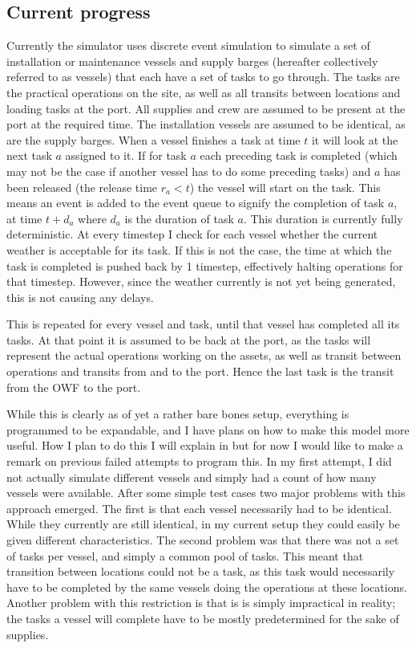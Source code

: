 \documentclass[a4paper,12pt]{article}
\begin{document}
\subsection{Current progress} \label{ss:simprog}
Currently the simulator uses discrete event simulation to simulate a set of installation or maintenance vessels and supply barges (hereafter collectively referred to as vessels) that each have a set of tasks to go through. The tasks are the practical operations on the site, as well as all transits between locations and loading tasks at the port. All supplies and crew are assumed to be present at the port at the required time. The installation vessels are assumed to be identical, as are the supply barges. When a vessel finishes a task at time $t$ it will look at the next task $a$ assigned to it. If for task $a$ each preceding task is completed (which may not be the case if another vessel has to do some preceding tasks) and $a$ has been released (the release time $r_a < t$) the vessel will start on the task. This means an event is added to the event queue to signify the completion of task $a$, at time $t + d_a$ where $d_a$ is the duration of task $a$. This duration is currently fully deterministic. At every timestep I check for each vessel whether the current weather is acceptable for its task. If this is not the case, the time at which the task is completed is pushed back by 1 timestep, effectively halting operations for that timestep. However, since the weather currently is not yet being generated, this is not causing any delays. 

This is repeated for every vessel and task, until that vessel has completed all its tasks. At that point it is assumed to be back at the port, as the tasks will represent the actual operations working on the assets, as well as transit between operations and transits from and to the port. Hence the last task is the transit from the OWF to the port. 

\bigskip

While this is clearly as of yet a rather bare bones setup, everything is programmed to be expandable, and I have plans on how to make this model more useful. How I plan to do this I will explain in  but for now I would like to make a remark on previous failed attempts to program this. In my first attempt, I did not actually simulate different vessels and simply had a count of how many vessels were available. After some simple test cases two major problems with this approach emerged. The first is that each vessel necessarily had to be identical. While they currently are still identical, in my current setup they could easily be given different characteristics. The second problem was that there was not a set of tasks per vessel, and simply a common pool of tasks. This meant that transition between locations could not be a task, as this task would necessarily have to be completed by the same vessels doing the operations at these locations. Another problem with this restriction is that is is simply impractical in reality; the tasks a vessel will complete have to be mostly predetermined for the sake of supplies.
\end{document}
